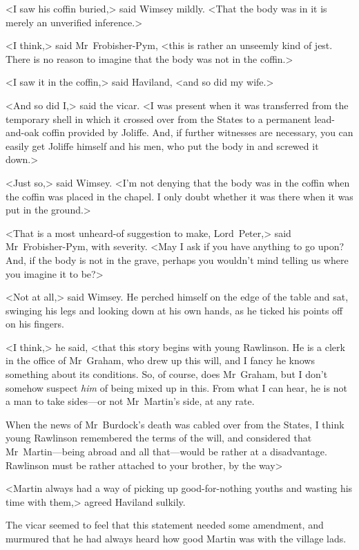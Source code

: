 <I saw his coffin buried,> said Wimsey mildly. <That the body was in it is merely an unverified inference.>

<I think,> said Mr~Frobisher-Pym, <this is rather an unseemly kind of jest. There is no reason to imagine that the body was not in the coffin.>

<I saw it in the coffin,> said Haviland, <and so did my wife.>

<And so did I,> said the vicar. <I was present when it was transferred from the temporary shell in which it crossed over from the States to a permanent lead-and-oak coffin provided by Joliffe. And, if further witnesses are necessary, you can easily get Joliffe himself and his men, who put the body in and screwed it down.>

<Just so,> said Wimsey. <I'm not denying that the body was in the coffin when the coffin was placed in the chapel. I only doubt whether it was there when it was put in the ground.>

<That is a most unheard-of suggestion to make, Lord~Peter,> said Mr~Frobisher-Pym, with severity. <May I ask if you have anything to go upon? And, if the body is not in the grave, perhaps you wouldn't mind telling us where you imagine it to be?>

<Not at all,> said Wimsey. He perched himself on the edge of the table and sat, swinging his legs and looking down at his own hands, as he ticked his points off on his fingers.

<I think,> he said, <that this story begins with young Rawlinson. He is a clerk in the office of Mr~Graham, who drew up this will, and I fancy he knows something about its conditions. So, of course, does Mr~Graham, but I don't somehow suspect \emph{him} of being mixed up in this. From what I can hear, he is not a man to take sides—or not Mr~Martin's side, at any rate.

When the news of Mr~Burdock's death was cabled over from the States, I think young Rawlinson remembered the terms of the will, and considered that Mr~Martin—being abroad and all that—would be rather at a disadvantage. Rawlinson must be rather attached to your brother, by the way\longdash>

<Martin always had a way of picking up good-for-nothing youths and wasting his time with them,> agreed Haviland sulkily.

The vicar seemed to feel that this statement needed some amendment, and murmured that he had always heard how good Martin was with the village lads.

